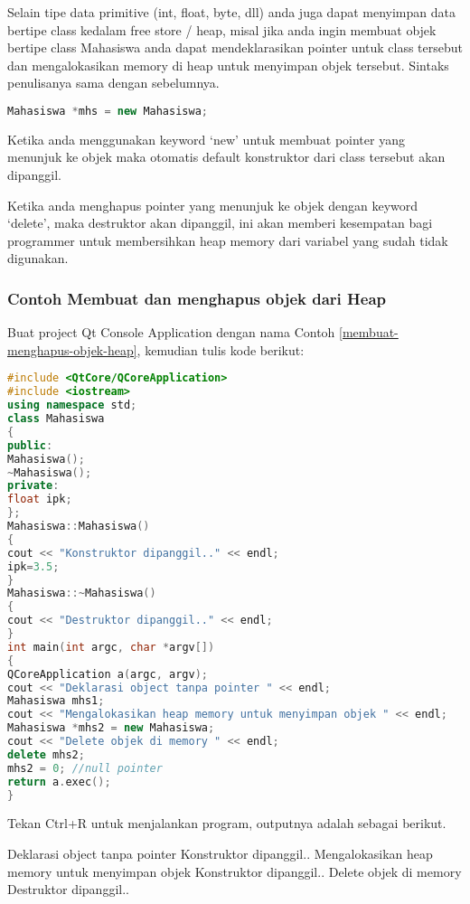 Selain tipe data primitive (int, float, byte, dll) anda juga dapat
menyimpan data bertipe class kedalam free store / heap, misal jika anda
ingin membuat objek bertipe class Mahasiswa anda dapat mendeklarasikan
pointer untuk class tersebut dan mengalokasikan memory di heap untuk
menyimpan objek tersebut. Sintaks penulisanya sama dengan sebelumnya.

\begin{lstlisting}[language=c++, numbers=none]
Mahasiswa *mhs = new Mahasiswa;
\end{lstlisting}

Ketika anda menggunakan keyword `new' untuk membuat pointer yang
menunjuk ke objek maka otomatis default konstruktor dari class tersebut
akan dipanggil.

Ketika anda menghapus pointer yang menunjuk ke objek dengan keyword
`delete', maka destruktor akan dipanggil, ini akan memberi kesempatan
bagi programmer untuk membersihkan heap memory dari variabel yang sudah
tidak digunakan.

\subsubsection*{Contoh  Membuat dan menghapus objek dari Heap}

Buat project Qt Console Application dengan nama Contoh \ref{membuat-menghapus-objek-heap}, kemudian tulis
kode berikut:

\begin{lstlisting}[language=c++, caption=Membuat dan menghapus objek dari Heap, label=membuat-menghapus-objek-heap]
#include <QtCore/QCoreApplication>
#include <iostream>
using namespace std;
class Mahasiswa
{
public:
Mahasiswa();
~Mahasiswa();
private:
float ipk;
};
Mahasiswa::Mahasiswa()
{
cout << "Konstruktor dipanggil.." << endl;
ipk=3.5;
}
Mahasiswa::~Mahasiswa()
{
cout << "Destruktor dipanggil.." << endl;
}
int main(int argc, char *argv[])
{
QCoreApplication a(argc, argv);
cout << "Deklarasi object tanpa pointer " << endl;
Mahasiswa mhs1;
cout << "Mengalokasikan heap memory untuk menyimpan objek " << endl;
Mahasiswa *mhs2 = new Mahasiswa;
cout << "Delete objek di memory " << endl;
delete mhs2;
mhs2 = 0; //null pointer
return a.exec();
}
\end{lstlisting}

Tekan Ctrl+R untuk menjalankan program, outputnya adalah sebagai
berikut.

\begin{lcverbatim}
Deklarasi object tanpa pointer
Konstruktor dipanggil..
Mengalokasikan heap memory untuk menyimpan objek
Konstruktor dipanggil..
Delete objek di memory
Destruktor dipanggil..
\end{lcverbatim}


